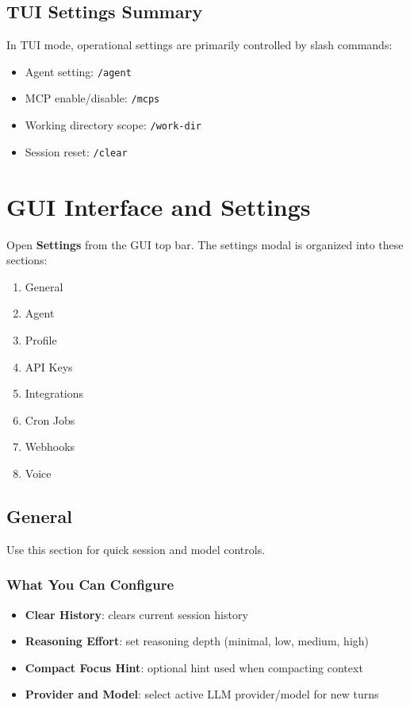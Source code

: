 \documentclass{article}
\begin{document}
\subsection{TUI Settings Summary}

In TUI mode, operational settings are primarily controlled by slash commands:
\begin{itemize}
    \item Agent setting: \texttt{/agent}
    \item MCP enable/disable: \texttt{/mcps}
    \item Working directory scope: \texttt{/work-dir}
    \item Session reset: \texttt{/clear}
\end{itemize}

\section{GUI Interface and Settings}

Open \textbf{Settings} from the GUI top bar. The settings modal is organized into these sections:

\begin{enumerate}
	\item General
	\item Agent
	\item Profile
	\item API Keys
	\item Integrations
	\item Cron Jobs
	\item Webhooks
	\item Voice
\end{enumerate}

\subsection{General}

Use this section for quick session and model controls.

\subsubsection{What You Can Configure}
\begin{itemize}
	\item \textbf{Clear History}: clears current session history
	\item \textbf{Reasoning Effort}: set reasoning depth (minimal, low, medium, high)
	\item \textbf{Compact Focus Hint}: optional hint used when compacting context
	\item \textbf{Provider and Model}: select active LLM provider/model for new turns
\end{itemize}
\end{document}
